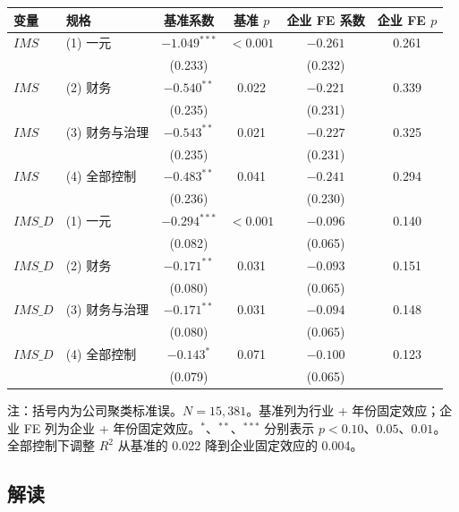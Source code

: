 \documentclass[11pt]{article}
\begin{document}
\begin{center}
\begin{threeparttable}
\caption{行业固定效应与企业固定效应}
\label{tab:main}
\begin{tabular}{llcccc}
\toprule
变量 & 规格 & 基准系数 & 基准 \(p\) & 企业 FE 系数 & 企业 FE \(p\) \\
\midrule
\(IMS\) & (1) 一元 & \(-1.049^{***}\) & \(<0.001\) & \(-0.261\) & 0.261 \\
 & & (0.233) & & (0.232) & \\
\(IMS\) & (2) 财务 & \(-0.540^{**}\) & 0.022 & \(-0.221\) & 0.339 \\
 & & (0.235) & & (0.231) & \\
\(IMS\) & (3) 财务与治理 & \(-0.543^{**}\) & 0.021 & \(-0.227\) & 0.325 \\
 & & (0.235) & & (0.231) & \\
\(IMS\) & (4) 全部控制 & \(-0.483^{**}\) & 0.041 & \(-0.241\) & 0.294 \\
 & & (0.236) & & (0.230) & \\
\midrule
\(IMS\_D\) & (1) 一元 & \(-0.294^{***}\) & \(<0.001\) & \(-0.096\) & 0.140 \\
 & & (0.082) & & (0.065) & \\
\(IMS\_D\) & (2) 财务 & \(-0.171^{**}\) & 0.031 & \(-0.093\) & 0.151 \\
 & & (0.080) & & (0.065) & \\
\(IMS\_D\) & (3) 财务与治理 & \(-0.171^{**}\) & 0.031 & \(-0.094\) & 0.148 \\
 & & (0.080) & & (0.065) & \\
\(IMS\_D\) & (4) 全部控制 & \(-0.143^{*}\) & 0.071 & \(-0.100\) & 0.123 \\
 & & (0.079) & & (0.065) & \\
\bottomrule
\end{tabular}
\begin{tablenotes}\footnotesize
\item 注：括号内为公司聚类标准误。\(N=15{,}381\)。基准列为行业 + 年份固定效应；企业 FE 列为企业 + 年份固定效应。\(^{*}\)、\(^{**}\)、\(^{***}\) 分别表示 \(p<0.10\)、\(0.05\)、\(0.01\)。全部控制下调整 \(R^2\) 从基准的 0.022 降到企业固定效应的 0.004。
\end{tablenotes}
\end{threeparttable}
\end{center}

\subsection{解读}
\end{document}
